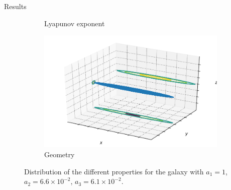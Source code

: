 \documentclass{beamer}
\newcommand\blfootnote[1]
{%
	\begingroup
	\renewcommand\thefootnote{}\footnote{#1}%
	\addtocounter{footnote}{-1}%
	\endgroup
}
\newcommand{\fcite}[1]{\blfootnote{\tiny\cite{#1}}}
\begin{document}
\begin{frame}{Results}
\begin{figure}[h]
\begin{subfigure}[t]{0.35\textwidth}
			\caption{Lyapunov exponent}
		\end{subfigure}
		\begin{subfigure}[t]{0.35\textwidth}
			\includegraphics[width=\textwidth]{"../Files/Week 13/images/24_ellipsoid"}
			\caption{Geometry}
		\end{subfigure}
		\caption{Distribution of the different properties for the galaxy with $a_1 = 1$, $a_2 = 6.6\times10^{-2}$, $a_3 = 6.1\times10^{-2}$.}
	\end{figure}
\end{frame}
%	
%
%
\end{document}
